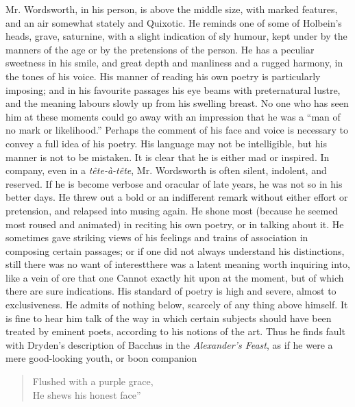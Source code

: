 Mr. Wordsworth, in his person, is above the middle size, with
marked features, and an air somewhat stately and Quixotic. He
reminds one of some of Holbein's heads, grave, saturnine, with a
slight indication of sly humour, kept under by the manners of the
age or by the pretensions of the person. He has a peculiar
sweetness in his smile, and great depth and manliness and a rugged
harmony, in the tones of his voice. His manner of reading his own
poetry is particularly imposing; and in his favourite passages his
eye beams with preternatural lustre, and the meaning labours
slowly up from his swelling breast. No one who has seen him at
these moments could go away with an impression that he was a ``man
of no mark or likelihood.'' Perhaps the comment of his face and
voice is necessary to convey a full idea of his poetry. His
language may not be intelligible, but his manner is not to be
mistaken. It is clear that he is either mad or inspired. In
company, even in a \emph{tête-à-tête}, Mr.  Wordsworth is often
silent, indolent, and reserved. If he is become verbose and
oracular of late years, he was not so in his better days.  He
threw out a bold or an indifferent remark without either effort or
pretension, and relapsed into musing again. He shone most (because
he seemed most roused and animated) in reciting his own poetry, or
in talking about it. He sometimes gave striking views of his
feelings and trains of association in composing certain passages;
or if one did not always understand his distinctions, still there
was no want of interest\textemdash there was a latent meaning
worth inquiring into, like a vein of ore that one Cannot exactly
hit upon at the moment, but of which there are sure
indications. His standard of poetry is high and severe, almost to
exclusiveness. He admits of nothing below, scarcely of any thing
above himself. It is fine to hear him talk of the way in which
certain subjects should have been treated by eminent poets,
according to his notions of the art. Thus he finds fault with
Dryden's description of Bacchus in the \emph{Alexander's Feast},
as if he were a mere good-looking youth, or boon
companion\textemdash
\begin{verse} Flushed with a purple grace,\\ He
shews his honest face''\textemdash
\end{verse} 
